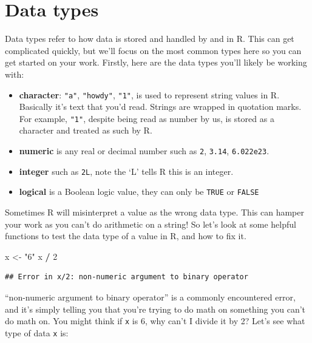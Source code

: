 \documentclass[
]{book}
\newenvironment{Shaded}{\begin{snugshade}}{\end{snugshade}}
\newcommand{\DecValTok}[1]{\textcolor[rgb]{0.00,0.00,0.81}{#1}}
\newcommand{\NormalTok}[1]{#1}
\newcommand{\OtherTok}[1]{\textcolor[rgb]{0.56,0.35,0.01}{#1}}
\newcommand{\SpecialCharTok}[1]{\textcolor[rgb]{0.81,0.36,0.00}{\textbf{#1}}}
\newcommand{\StringTok}[1]{\textcolor[rgb]{0.31,0.60,0.02}{#1}}
\providecommand{\tightlist}{%
  \setlength{\itemsep}{0pt}\setlength{\parskip}{0pt}}
\begin{document}
\hypertarget{data-types}{%
\section{Data types}\label{data-types}}

Data types refer to how data is stored and handled by and in R. This can get complicated quickly, but we'll focus on the most common types here so you can get started on your work. Firstly, here are the data types you'll likely be working with:

\begin{itemize}
\tightlist
\item
  \textbf{character}: \texttt{"a"}, \texttt{"howdy"}, \texttt{"1"}, is used to represent string values in R. Basically it's text that you'd read. Strings are wrapped in quotation marks. For example, \texttt{"1"}, despite being read as number by us, is stored as a character and treated as such by R.
\item
  \textbf{numeric} is any real or decimal number such as \texttt{2}, \texttt{3.14}, \texttt{6.022e23}.
\item
  \textbf{integer} such as \texttt{2L}, note the `L' tells R this is an integer.\\
\item
  \textbf{logical} is a Boolean logic value, they can only be \texttt{TRUE} or \texttt{FALSE}
\end{itemize}

Sometimes R will misinterpret a value as the wrong data type. This can hamper your work as you can't do arithmetic on a string! So let's look at some helpful functions to test the data type of a value in R, and how to fix it.

\begin{Shaded}
\begin{Highlighting}[]
\NormalTok{x }\OtherTok{\textless{}{-}} \StringTok{"6"}
\NormalTok{x }\SpecialCharTok{/} \DecValTok{2}
\end{Highlighting}
\end{Shaded}

\begin{verbatim}
## Error in x/2: non-numeric argument to binary operator
\end{verbatim}

``non-numeric argument to binary operator'' is a commonly encountered error, and it's simply telling you that you're trying to do math on something you can't do math on. You might think if \texttt{x} is 6, why can't I divide it by 2? Let's see what type of data \texttt{x} is:
\end{document}
